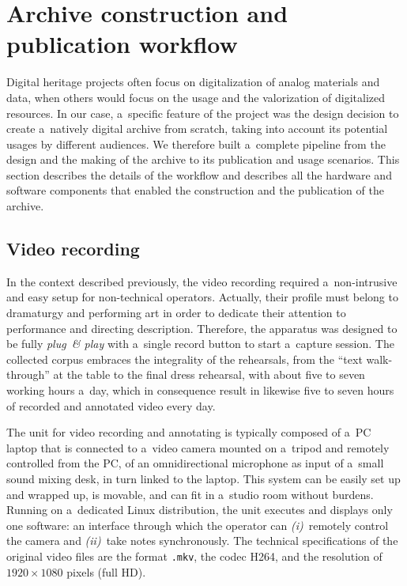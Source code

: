 \documentclass[conference]{IEEEtran}
\newcommand{\todo}[1]{\noindent\textcolor{red}{{\bf \{ToDo} #1{\bf \}}}}
\begin{document}
\section{Archive construction and publication workflow}
\label{sec:workflow}


Digital heritage projects often focus on digitalization of analog materials and data,
when others would focus on the usage and the valorization of digitalized resources.
In our case, a~specific feature of the project was the design decision to create a~natively 
digital archive from scratch,  taking into account its potential usages by different audiences.
We therefore built a~complete pipeline from the design and the making of the archive
to its publication and usage scenarios. This section describes the details of the workflow 
and describes all the hardware and software components that enabled  the construction 
and the publication  of the archive.

\subsection{Video recording}
In the context described previously, the video recording required a~non-intrusive and easy setup for non-technical operators. Actually, their profile must belong to dramaturgy and performing art in order to dedicate their attention to performance and directing description. Therefore, the apparatus was designed to be fully \emph{plug\ \& play} with a~single record button to start a~capture session.
The collected corpus embraces the integrality of the rehearsals, from the ``text walk-through'' at the table to the final dress rehearsal, with about five to seven working hours a~day, which in consequence result in likewise five to seven hours of recorded and annotated video every day.

The unit for video recording and annotating is typically composed of a~PC laptop that is connected to a~video camera mounted on a~tripod and remotely controlled from the PC, of an omnidirectional microphone as input of a~small sound mixing desk, in turn linked to the laptop. This system can be easily set up and wrapped up, is movable, and can fit in a~studio room without burdens. Running on a~dedicated Linux distribution, the unit executes and displays only one software: an interface through which the operator can \emph{(i)}~remotely control the camera and \emph{(ii)}~take notes synchronously. 
The technical specifications of the original video files are the format \texttt{.mkv}, the codec H264, and the resolution of $1920 \times 1080$ pixels (full HD).
\end{document}

